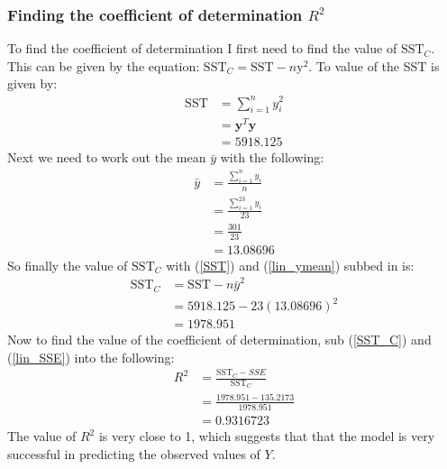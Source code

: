 \documentclass[12pt]{article}
\newcommand{\vect}[1]{\boldsymbol{#1}}
\newcommand{\mean}[1]{\bar{#1}}
\newcommand{\trans}[1]{#1^T}
\begin{document}
\subsubsection{Finding the coefficient  of determination $R^2$}
To find the coefficient of determination I first need to find the value of $\text{SST}_C$. This can be given by the equation: $\text{SST}_C=\text{SST}-n\text{y}^2$. To value of the SST is given by:
\begin{align}
  \text{SST} & = \sum_{i=1}^{n} y_i^2 \nonumber \\
             & = \trans{\vect{y}}\vect{y} \nonumber \\
             & = 5918.125 \label{SST}
\end{align}
Next we need to work out the mean $\mean{y}$ with the following:
\begin{align}
  \mean{y} & = \frac{\sum_{i=1}^{n}y_i}{n} \nonumber \\
           & = \frac{\sum_{i=1}^{23}y_i}{23} \nonumber \\
           & = \frac{301}{23} \nonumber \\
           & = 13.08696 \label{lin_ymean}
\end{align}
So finally the value of $\text{SST}_C$ with (\ref{SST}) and (\ref{lin_ymean}) subbed in is:
\begin{align}
  \text{SST}_C & = \text{SST} - n\mean{y}^2 \nonumber \\
               & = 5918.125 - 23(13.08696)^2 \nonumber \\
               & = 1978.951 \label{SST_C}
\end{align}
Now to find the value of the coefficient of determination, sub (\ref{SST_C}) and (\ref{lin_SSE}) into the following:
\begin{align}
    R^2 & = \frac{\text{SST}_C - SSE}{\text{SST}_C} \nonumber \\
        & = \frac{1978.951 - 135.2173}{1978.951} \nonumber \\
        & = 0.9316723 \label{lin_R}
\end{align}
The value of $R^2$ is very close to 1, which suggests that that the model is very successful in predicting the observed values of $Y$.
\end{document}
